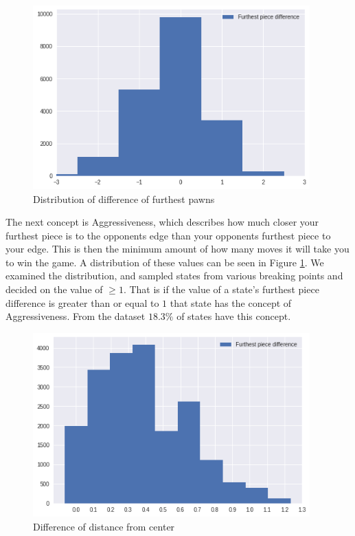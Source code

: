 \begin{figure}
    \begin{small}
        \begin{center}
            \includegraphics[width=0.95\textwidth]{graphics/dist_aggressiveness}
        \end{center}
        \caption{Distribution of difference of furthest pawns}
        \label{fig:distaggressiveness}
    \end{small}
\end{figure}

The next concept is Aggressiveness, which describes how much closer your furthest piece is to the opponents edge than your opponents furthest piece to your edge. This is then the minimum amount of how many moves it will take you to win the game. A distribution of these values can be seen in Figure \ref{fig:distaggressiveness}. We examined the distribution, and sampled states from various breaking points and decided on the value of $\geq 1$. That is if the value of a state's furthest piece difference is greater than or equal to $1$ that state has the concept of Aggressiveness. From the dataset $18.3\%$ of states have this concept.

\begin{figure}
    \begin{small}
        \begin{center}
            \includegraphics[width=0.95\textwidth]{graphics/dist_unity}
        \end{center}
        \caption{Difference of distance from center}
        \label{fig:distunity}
    \end{small}
\end{figure}


